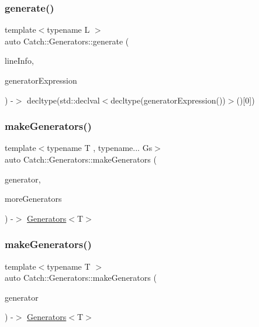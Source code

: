 \subsubsection{\texorpdfstring{generate()}{generate()}}
{\footnotesize\ttfamily template$<$typename L $>$ \\
auto Catch\+::\+Generators\+::generate (\begin{DoxyParamCaption}\item[{\mbox{\hyperlink{struct_catch_1_1_source_line_info}{Source\+Line\+Info}} const \&}]{line\+Info,  }\item[{L const \&}]{generator\+Expression }\end{DoxyParamCaption}) -\/$>$ decltype(std\+::declval$<$decltype(generator\+Expression())$>$()\mbox{[}0\mbox{]}) }

\mbox{\label{namespace_catch_1_1_generators_a4bc7b325c8cc81740e2527c689ff5d33}} 
\subsubsection{\texorpdfstring{make\+Generators()}{makeGenerators()}\hspace{0.1cm}{\footnotesize\ttfamily [1/4]}}
{\footnotesize\ttfamily template$<$typename T , typename... Gs$>$ \\
auto Catch\+::\+Generators\+::make\+Generators (\begin{DoxyParamCaption}\item[{\mbox{\hyperlink{class_catch_1_1_generators_1_1_generator}{Generator}}$<$ T $>$ \&\&}]{generator,  }\item[{Gs...}]{more\+Generators }\end{DoxyParamCaption}) -\/$>$ \mbox{\hyperlink{struct_catch_1_1_generators_1_1_generators}{Generators}}$<$T$>$ }

\mbox{\label{namespace_catch_1_1_generators_a95506ebb833cdeb743e0068f52aa930b}} 
\subsubsection{\texorpdfstring{make\+Generators()}{makeGenerators()}\hspace{0.1cm}{\footnotesize\ttfamily [2/4]}}
{\footnotesize\ttfamily template$<$typename T $>$ \\
auto Catch\+::\+Generators\+::make\+Generators (\begin{DoxyParamCaption}\item[{\mbox{\hyperlink{class_catch_1_1_generators_1_1_generator}{Generator}}$<$ T $>$ \&\&}]{generator }\end{DoxyParamCaption}) -\/$>$ \mbox{\hyperlink{struct_catch_1_1_generators_1_1_generators}{Generators}}$<$T$>$ }

